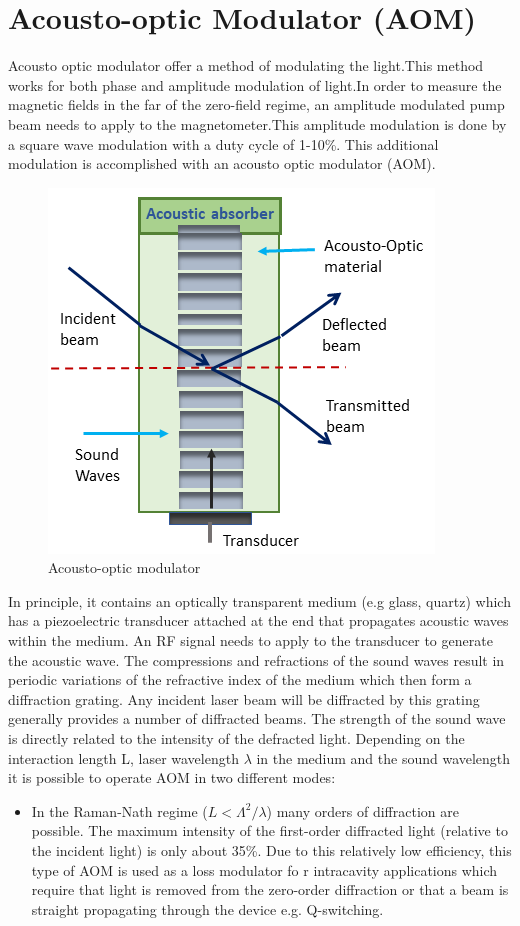 \documentclass[12pt]{report}
\begin{document}
\section{Acousto-optic Modulator (AOM)}
Acousto optic modulator offer a method of modulating the light.This method works for both phase and amplitude modulation of light.In order to measure the magnetic fields in the far of the zero-field regime, an amplitude modulated pump beam needs to apply to the magnetometer.This amplitude modulation is done by a square wave modulation with a duty cycle of 1-10\%. This additional modulation is accomplished with an acousto optic modulator (AOM).
\begin{figure}[h]
\centering
\includegraphics[width=0.7\linewidth]{figures/AOM}
\caption{Acousto-optic modulator}
\end{figure}
In principle, it contains an optically transparent medium (e.g glass, quartz) which has a piezoelectric transducer attached at the end that propagates acoustic waves within the medium. An RF signal needs to apply to the transducer to generate the acoustic wave. The compressions and refractions of the sound waves result in periodic variations of the refractive index of the medium which then form a diffraction grating. Any incident laser beam will be diffracted by this grating generally provides a number of diffracted beams. The strength of the sound wave is directly related to the intensity of the defracted light. Depending on the interaction length L, laser wavelength $\lambda$ in the medium and the sound wavelength it is possible to operate AOM in two different modes: 
\begin{itemize}
\item  In the Raman-Nath regime ($L<\Lambda^2/\lambda$) many orders of diffraction are possible. The maximum intensity of the first-order diffracted light (relative to the incident light) is only about 35\%. Due to this relatively low efficiency, this type of AOM is used as a loss modulator fo r intracavity applications which require that light is removed from the zero-order diffraction or that a beam is straight propagating through the device e.g. Q-switching.


\end{itemize}
\end{document}
